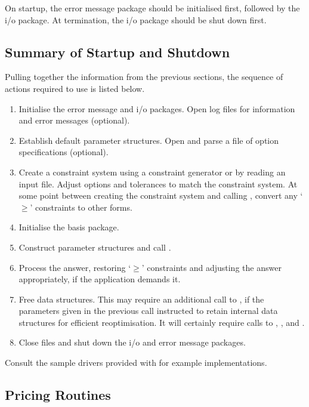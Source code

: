On startup, the error message package should be initialised first, followed by
the i/o package.
At termination, the i/o package should be shut down first.

\subsection{Summary of \dylp Startup and Shutdown}

Pulling together the information from the previous sections, the sequence of
actions required to use \dylp is listed below.
\begin{enumerate}
  \item
  Initialise the error message and i/o packages.
  Open log files for information and error messages (optional).

  \item
  Establish default parameter structures.
  Open and parse a file of \dylp option specifications (optional).

  \item
  Create a constraint system using a constraint generator or by reading an
  input file.
  Adjust options and tolerances to match the constraint system.
  At some point between creating the constraint system and calling
  , convert any `$\geq$' constraints to other forms.

  \item
  Initialise the basis package.

  \item
  Construct parameter structures and call .

  \item
  Process the answer, restoring `$\geq$' constraints and adjusting the answer
  appropriately, if the application demands it.

  \item
  Free data structures.
  This may require an additional call to , if the parameters
  given in the previous call instructed \dylp to retain internal data
  structures for efficient reoptimisation.
  It will certainly require calls to ,
  , and .

  \item
  Close files and shut down the i/o and error message packages.
\end{enumerate}
Consult the sample drivers provided with \dylp for example implementations.

\subsection{Pricing Routines}
\label{PricingRoutines}

